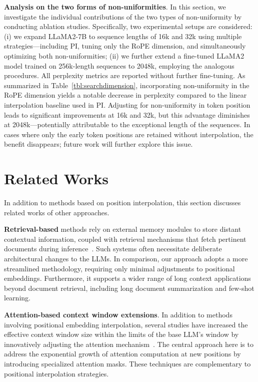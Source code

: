 \textbf{Analysis on the two forms of non-uniformities}. In this section, we investigate the individual contributions of the two types of non-uniformity by conducting ablation studies. Specifically, two experimental setups are considered: (i) we expand LLaMA2-7B to sequence lengths of 16k and 32k using multiple strategies—including PI, tuning only the RoPE dimension, and simultaneously optimizing both non-uniformities; (ii) we further extend a fine-tuned LLaMA2 model trained on 256k-length sequences to 2048k, employing the analogous procedures. All perplexity metrics are reported without further fine-tuning. As summarized in Table~\ref{tbl:searchdimension}, incorporating non-uniformity in the RoPE dimension yields a notable decrease in perplexity compared to the linear interpolation baseline used in PI. Adjusting for non-uniformity in token position leads to significant improvements at 16k and 32k, but this advantage diminishes at 2048k—potentially attributable to the exceptional length of the sequences. In cases where only the early token positions are retained without interpolation, the benefit disappears; future work will further explore this issue.

\section{Related Works}

In addition to methods based on position interpolation, this section discusses related works of other approaches. 

\textbf{Retrieval-based} methods rely on external memory modules to store distant contextual information, coupled with retrieval mechanisms that fetch pertinent documents during inference~\cite{longllama,wang2023augmenting,borgeaud2022improving}. Such systems often necessitate deliberate architectural changes to the LLMs. In comparison, our approach adopts a more streamlined methodology, requiring only minimal adjustments to positional embeddings. Furthermore, it supports a wider range of long context applications beyond document retrieval, including long document summarization and few-shot learning.

\textbf{Attention-based context window extensions}. In addition to methods involving positional embedding interpolation, several studies have increased the effective context window size within the limits of the base LLM’s window by innovatively adjusting the attention mechanism~\cite{han2023lminfinite, streamingllm,parallelwindow}. The central approach here is to address the exponential growth of attention computation at new positions by introducing specialized attention masks. These techniques are complementary to positional interpolation strategies.

